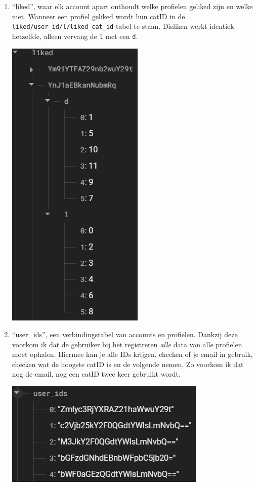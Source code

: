 \documentclass{report}
\begin{document}
\begin{enumerate}
    \item ``liked'', waar elk account apart onthoudt welke profielen geliked zijn en welke niet.
    Wanneer een profiel geliked wordt hun catID in de \verb|liked/user_id/l/liked_cat_id| tabel te staan.
    Disliken werkt identiek hetzelfde, alleen vervang de \verb|l| met een \verb|d|.
    \begin{center}
        \includegraphics{DB_liked}
    \end{center}

    \item ``user\_ids'', een verbindingstabel van accounts en profielen.
    Dankzij deze voorkom ik dat de gebruiker bij het registreren \textit{alle} data van alle profielen moet ophalen.
    Hiermee kan je alle IDs krijgen, checken of je email in gebruik, checken wat de hoogste catID is en de volgende nemen.
    Zo voorkom ik dat nog de email, nog een catID twee keer gebruikt wordt.
    \begin{center}
        \includegraphics{DB_userids}
    \end{center}

\end{enumerate}
\end{document}
